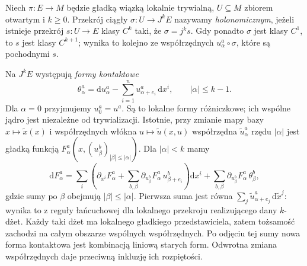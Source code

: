 \begin{definicja}
\label{def:dzety-holonomic}
Niech $\pi:E\to M$ będzie gładką wiązką lokalnie
trywialną, $U\subseteq M$ zbiorem otwartym i $k\ge0$.
Przekrój ciągły $\sigma:U\to J^kE$ nazywamy
\emph{holonomicznym}, jeżeli istnieje przekrój
$s:U\to E$ klasy $C^k$ taki, że $\sigma=j^ks$.
Gdy ponadto $\sigma$ jest klasy $C^1$, to $s$ jest
klasy $C^{k+1}$; wynika to kolejno ze współrzędnych
$u^a_\alpha\circ\sigma$, które są pochodnymi $s$.
\end{definicja}

Na $J^kE$ występują \emph{formy kontaktowe}
\[
 \theta^a_\alpha=\mathrm d u^a_\alpha
 -\sum_{i=1}^n u^a_{\alpha+e_i}\,\mathrm d x^i,
 \qquad |\alpha|\le k-1.
\]
Dla $\alpha=0$ przyjmujemy $u_0^a=u^a$.
Są to lokalne formy różniczkowe; ich wspólne jądro
jest niezależne od trywializacji. Istotnie,
przy zmianie mapy bazy $x\mapsto\widetilde x(x)$
i współrzędnych włókna $u\mapsto\widetilde u(x,u)$
współrzędna $\widetilde u^a_\alpha$ rzędu $|\alpha|$
jest gładką funkcją $F^a_\alpha(x,(u^b_\beta)_{|\beta|\le|\alpha|})$.
Dla $|\alpha|<k$ mamy
\[
 \mathrm dF^a_\alpha
 =\sum_i\left(\partial_{x^i}F^a_\alpha+
 \sum_{b,\beta}\partial_{u^b_\beta}F^a_\alpha\,
 u^b_{\beta+e_i}\right)\mathrm dx^i
 +\sum_{b,\beta}\partial_{u^b_\beta}F^a_\alpha\,\theta^b_\beta,
\]
gdzie sumy po $\beta$ obejmują $|\beta|\le|\alpha|$.
Pierwsza suma jest równa
$\sum_j\widetilde u^a_{\alpha+e_j}\,\mathrm d\widetilde x^j$:
wynika to z reguły łańcuchowej dla lokalnego przekroju
realizującego dany $k$-dżet. Każdy taki dżet ma
lokalnego gładkiego przedstawiciela, zatem tożsamość
zachodzi na całym obszarze wspólnych współrzędnych.
Po odjęciu tej sumy nowa forma kontaktowa jest
kombinacją liniową starych form. Odwrotna zmiana
współrzędnych daje przeciwną inkluzję ich rozpiętości.

